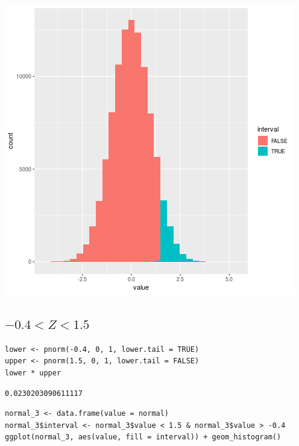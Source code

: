\documentclass[11pt]{article}
\begin{document}
\begin{center}
\includegraphics[width=.9\linewidth]{1-2.png}
\end{center}

\subsection{\(-0.4 < Z < 1.5\)}
\label{sec:orge3c9ea3}

\begin{verbatim}
lower <- pnorm(-0.4, 0, 1, lower.tail = TRUE)
upper <- pnorm(1.5, 0, 1, lower.tail = FALSE)
lower * upper
\end{verbatim}

\begin{verbatim}
0.0230203090611117
\end{verbatim}


\begin{verbatim}
normal_3 <- data.frame(value = normal)
normal_3$interval <- normal_3$value < 1.5 & normal_3$value > -0.4
ggplot(normal_3, aes(value, fill = interval)) + geom_histogram()
\end{verbatim}
\end{document}
